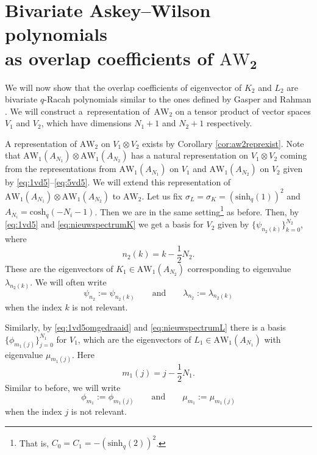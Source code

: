 \documentclass[pdftex]{sigma}
\numberwithin{equation}{section}
\newcommand{\awc}[2]{\mathrm{AW}_{#1}\!\left(#2\right)}
\newcommand{\AW}[1]{\mathrm{AW}_{#1}}
\newcommand{\chq}{\mathrm{cosh}_q}
\newcommand{\half}{\frac{1}{2}}
\newcommand{\shq}{\mathrm{sinh}_q}
\begin{document}
\section[Bivariate Askey--Wilson polynomials as overlap coefficients of AW\_2]{Bivariate Askey--Wilson polynomials\\ as overlap coefficients of $\boldsymbol{\AW{2}}$}\label{sec:bivarqracah}

We will now show that the overlap coefficients of eigenvector of $K_2$ and $L_2$ are bivariate $q$-Racah polynomials similar to the ones defined by Gasper and Rahman \cite{Gasper2007}. We will construct a~representation of~$\AW{2}$ on a tensor product of vector spaces $V_1$ and $V_2$, which have dimensions $N_1+1$ and $N_2+1$ respectively.

A representation of $\AW{2}$ on $V_1\otimes V_2$ exists by Corollary \ref{cor:aw2reprexist}. Note that $\awc{1}{A_{N_1}}\otimes\awc{1}{A_{N_2}}$ has a natural representation on $V_1\otimes V_2$ coming from the representations from $\awc{1}{A_{N_1}}$ on $V_1$ and $\awc{1}{A_{N_2}}$ on $V_2$ given by \eqref{eq:1vd5}--\eqref{eq:5vd5}. We will extend this representation of $\awc{1}{A_{N_1}}\otimes\awc{1}{A_{N_2}}$ to $\AW{2}$.
Let us fix $\sigma_L=\sigma_K=(\shq(1))^2$ and $A_{N_i}=\chq(-N_i-1)$. Then we are in the same setting\footnote{That is, $C_0=C_1=-(\shq(2))^2$.} as before. Then, by \eqref{eq:1vd5} and \eqref{eq:nieuwspectrumK} we get a basis for $V_2$ given by $\{\psi_{n_2(k)}\}_{k=0}^{N_2}$, where
\[
n_2(k)=k-\half N_2 .
\]
These are the eigenvectors of $K_1\in\awc{1}{A_{N_2}}$ corresponding to eigenvalue $\lambda_{n_2(k)}$. We will often write
\[
\psi_{n_2}:=\psi_{n_2(k)} \qquad \text{and}\qquad \lambda_{n_2}:=\lambda_{n_2(k)}
\]
when the index $k$ is not relevant.

Similarly, by \eqref{eq:1vd5omgedraaid} and \eqref{eq:nieuwspectrumL} there is a basis $\{\phi_{m_1(j)}\}_{j=0}^{N_1}$ for $V_1$, which are the eigenvectors of $L_1\in\awc{1}{A_{N_1}}$ with eigenvalue $\mu_{m_1(j)}$. Here
\[
m_1(j)=j-\half N_1.
\]
Similar to before, we will write
\[
\phi_{m_1}:=\phi_{m_1(j)} \qquad \text{and}\qquad \mu_{m_1}:=\mu_{m_1(j)}
\]
when the index $j$ is not relevant.
\end{document}
